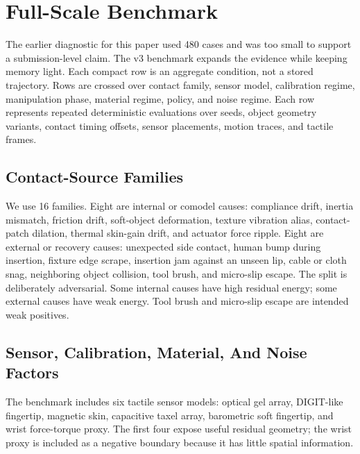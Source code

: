 \documentclass{article}
\begin{document}
\section{Full-Scale Benchmark}

The earlier diagnostic for this paper used 480 cases and was too small to support a submission-level claim. The v3 benchmark expands the evidence while keeping memory light. Each compact row is an aggregate condition, not a stored trajectory. Rows are crossed over contact family, sensor model, calibration regime, manipulation phase, material regime, policy, and noise regime. Each row represents repeated deterministic evaluations over seeds, object geometry variants, contact timing offsets, sensor placements, motion traces, and tactile frames.

\begin{table}[t]
\centering
\small
\resizebox{\linewidth}{!}{}
\caption{Full-scale benchmark dimensions. Compact rows are stored once; represented evaluations are deterministic aggregates over seeds, object variants, timing offsets, sensor placements, motion traces, and tactile frames.}
\label{tab:scale}
\end{table}

\subsection{Contact-Source Families}

We use 16 families. Eight are internal or comodel causes: compliance drift, inertia mismatch, friction drift, soft-object deformation, texture vibration alias, contact-patch dilation, thermal skin-gain drift, and actuator force ripple. Eight are external or recovery causes: unexpected side contact, human bump during insertion, fixture edge scrape, insertion jam against an unseen lip, cable or cloth snag, neighboring object collision, tool brush, and micro-slip escape. The split is deliberately adversarial. Some internal causes have high residual energy; some external causes have weak energy. Tool brush and micro-slip escape are intended weak positives.

\subsection{Sensor, Calibration, Material, And Noise Factors}

The benchmark includes six tactile sensor models: optical gel array, DIGIT-like fingertip, magnetic skin, capacitive taxel array, barometric soft fingertip, and wrist force-torque proxy. The first four expose useful residual geometry; the wrist proxy is included as a negative boundary because it has little spatial information.
\end{document}
